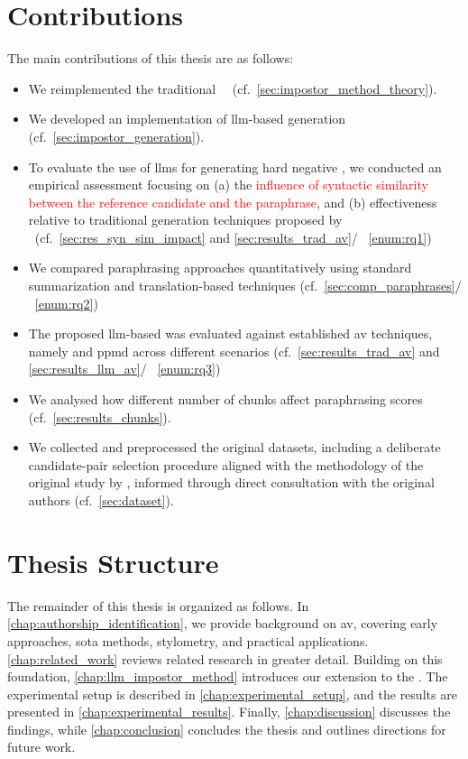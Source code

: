 \section{Contributions}
\label{sec:contributions}
The main contributions of this thesis are as follows:
\begin{itemize}
    \item We reimplemented the traditional \impAppr{}~\citep{koppel_determining_2014}\ (cf.~\autoref{sec:impostor_method_theory}).
    \item We developed an implementation of \ac{llm}-based \imp{} generation (cf.~\autoref{sec:impostor_generation}). 
    \item To evaluate the use of \acp{llm} for generating hard negative \imps{}, we conducted an empirical assessment focusing on (a) the \textcolor{red}{influence of syntactic similarity between the reference candidate and the paraphrase}, and (b) effectiveness relative to traditional \imp{} generation techniques proposed by \citet{koppel_determining_2014}\ (cf.~\autoref{sec:res_syn_sim_impact} and \autoref{sec:results_trad_av}/ ~\ref{enum:rq1})
    \item We compared paraphrasing approaches quantitatively using standard summarization and translation-based techniques (cf.~\autoref{sec:comp_paraphrases}/ ~\ref{enum:rq2})
    \item The proposed \ac{llm}-based \impAppr{} was evaluated against established \ac{av} techniques, namely \unmasking{} and \ac{ppmd} across different scenarios (cf.~\autoref{sec:results_trad_av} and \autoref{sec:results_llm_av}/ ~\ref{enum:rq3})
    \item We analysed how different number of chunks affect paraphrasing scores (cf.~\autoref{sec:results_chunks}).
    \item We collected and preprocessed the original datasets, including a deliberate candidate-pair selection procedure aligned with the methodology of the original study by \citet{koppel_determining_2014}, informed through direct consultation with the original authors (cf.~\autoref{sec:dataset}).
\end{itemize}



\section{Thesis Structure}
\label{sec:thesis_structure}
The remainder of this thesis is organized as follows. 
In \autoref{chap:authorship_identification}, we provide background on \acf{av}, covering early approaches, \acl{sota} methods, stylometry, and practical applications. 
\autoref{chap:related_work} reviews related research in greater detail. 
Building on this foundation, \autoref{chap:llm_impostor_method} introduces our extension to the \impAppr{}. 
The experimental setup is described in \autoref{chap:experimental_setup}, and the results are presented in \autoref{chap:experimental_results}. 
Finally, \autoref{chap:discussion} discusses the findings, while \autoref{chap:conclusion} concludes the thesis and outlines directions for future work.
